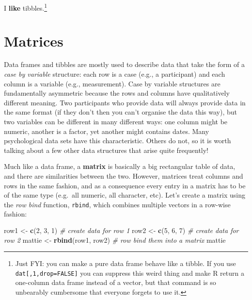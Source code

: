 \documentclass[]{book}
\newenvironment{Shaded}{\begin{snugshade}}{\end{snugshade}}
\newcommand{\CommentTok}[1]{\textcolor[rgb]{0.56,0.35,0.01}{\textit{#1}}}
\newcommand{\DecValTok}[1]{\textcolor[rgb]{0.00,0.00,0.81}{#1}}
\newcommand{\KeywordTok}[1]{\textcolor[rgb]{0.13,0.29,0.53}{\textbf{#1}}}
\newcommand{\NormalTok}[1]{#1}
\newcommand{\StringTok}[1]{\textcolor[rgb]{0.31,0.60,0.02}{#1}}
\let\rmarkdownfootnote\footnote%
\def\footnote{\protect\rmarkdownfootnote}
\begin{document}
I \textbf{like} tibbles.\footnote{Just FYI: you can make a pure data frame behave like a tibble. If you use \texttt{dat{[},1,drop=FALSE{]}} you can suppress this weird thing and make R return a one-column data frame instead of a vector, but that command is so unbearably cumbersome that everyone forgets to use it.}

\hypertarget{matrices}{%
\section{Matrices}\label{matrices}}

Data frames and tibbles are mostly used to describe data that take the form of a \emph{case by variable} structure: each row is a case (e.g., a participant) and each column is a variable (e.g., measurement). Case by variable structures are fundamentally asymmetric because the rows and columns have qualitatively different meaning. Two participants who provide data will always provide data in the same format (if they don't then you can't organise the data this way), but two variables can be different in many different ways: one column might be numeric, another is a factor, yet another might contains dates. Many psychological data sets have this characteristic. Others do not, so it is worth talking about a few other data structures that arise quite frequently!

Much like a data frame, a \textbf{matrix} is basically a big rectangular table of data, and there are similarities between the two. However, matrices treat columns and rows in the same fashion, and as a consequence every entry in a matrix has to be of the same type (e.g.~all numeric, all character, etc). Let's create a matrix using the \emph{row bind} function, \texttt{rbind}, which combines multiple vectors in a row-wise fashion:

\begin{Shaded}
\begin{Highlighting}[]
\NormalTok{row1 <-}\StringTok{ }\KeywordTok{c}\NormalTok{(}\DecValTok{2}\NormalTok{, }\DecValTok{3}\NormalTok{, }\DecValTok{1}\NormalTok{)          }\CommentTok{# create data for row 1}
\NormalTok{row2 <-}\StringTok{ }\KeywordTok{c}\NormalTok{(}\DecValTok{5}\NormalTok{, }\DecValTok{6}\NormalTok{, }\DecValTok{7}\NormalTok{)          }\CommentTok{# create data for row 2}
\NormalTok{mattie <-}\StringTok{ }\KeywordTok{rbind}\NormalTok{(row1, row2) }\CommentTok{# row bind them into a matrix}
\NormalTok{mattie}
\end{Highlighting}
\end{Shaded}
\end{document}
